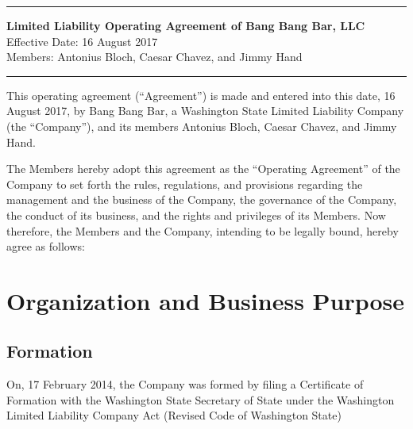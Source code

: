 \documentclass[11pt,onecolumn]{article}
\newcommand{\thisdate}{16 August 2017}
\newcommand{\company}{Bang Bang Bar}
\newcommand{\members}{Antonius Bloch, Caesar Chavez, and Jimmy Hand}
\begin{document}
\thispagestyle{fancy2} 

\begin{center}
	\hrule
	{\sffamily\bfseries\LARGE
		Limited Liability Operating Agreement of Bang Bang Bar, LLC
	} \\
	\vspace{3pt}
	{
		\hspace*{\fill}
		Effective Date: \thisdate{}
		\hspace*{\fill}
	}\\
	\vspace{3pt}
	{
		\hspace*{\fill}
		Members: \members{}
		\hspace*{\fill}
	}\\
\vspace{2\baselineskip}
\hrule
\end{center}

\begin{singlespace}
\tableofcontents
\end{singlespace}


This operating agreement (``Agreement'') is made and entered into this date, \thisdate{}, by \company{}, a Washington State Limited Liability Company (the ``Company''), and its members \members.

The Members hereby adopt this agreement as the ``Operating Agreement'' of the Company to set forth the rules, regulations, and provisions regarding the management and the business of the Company, the governance of the Company, the conduct of its business, and the rights and privileges of its Members.
Now therefore, the Members and the Company, intending to be legally bound, hereby agree as follows:

\section{Organization and Business Purpose}

\subsection{Formation} 

On, 17 February 2014, the Company was formed by filing a Certificate of  Formation with the Washington State Secretary of State under the Washington Limited Liability Company Act (Revised Code of Washington State)
\end{document}
